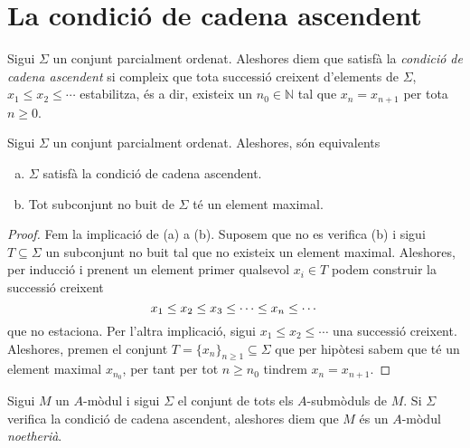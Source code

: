 \documentclass[../../../main.tex]{subfiles}
\begin{document}
\section{La condició de cadena ascendent}

\begin{defi}
\label{def:cadenaAscendent} Sigui $\Sigma$ un conjunt parcialment ordenat. Aleshores diem que satisfà la \textit{condició de cadena ascendent} si compleix que tota successió creixent d'elements de $\Sigma$, $x_1\leq x_2\leq\cdots$ estabilitza, és a dir, existeix un $n_0\in \mathbb{N}$ tal que $x_n = x_{n+1}$ per tota $n\geq 0$.
\end{defi}

\begin{prop}
\label{prop:cadenaAscendent} Sigui $\Sigma$ un conjunt parcialment ordenat. Aleshores, són equivalents
\begin{enumerate}[(a)]
    \item $\Sigma$ satisfà la condició de cadena ascendent.
    \item Tot subconjunt no buit de $\Sigma$ té un element maximal.
\end{enumerate}
\end{prop}
\begin{proof}
Fem la implicació de (a) a (b). Suposem que no es verifica (b) i sigui $T\subseteq\Sigma$ un subconjunt no buit tal que no existeix un element maximal. Aleshores, per inducció i prenent un element primer qualsevol $x_i\in T$ podem construir la successió creixent
\begin{equation}
    \notag
    x_1\leq x_2\leq x_3\leq \cdots\leq x_n\leq \cdots
\end{equation}
que no estaciona. Per l'altra implicació, sigui $x_1\leq x_2\leq \cdots$ una successió creixent. Aleshores, premen el conjunt $T = \{x_n\}_{n\geq 1}\subseteq\Sigma$ que per hipòtesi sabem que té un element maximal $x_{n_0}$, per tant per tot $n\geq n_0$ tindrem $x_n = x_{n+1}$.
\end{proof}

\begin{defi}
\label{def:modulNoetheria} Sigui $M$ un $A$-mòdul i sigui $\Sigma$ el conjunt de tots els $A$-submòduls de $M$. Si $\Sigma$ verifica la condició de cadena ascendent, aleshores diem que $M$ és un $A$-mòdul \textit{noetherià}.
\end{defi}
\end{document}
